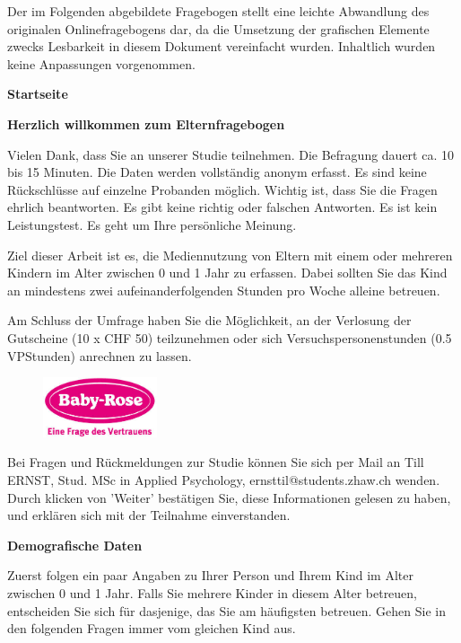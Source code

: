 Der im Folgenden abgebildete Fragebogen stellt eine leichte Abwandlung des originalen Onlinefragebogens dar, da die Umsetzung der grafischen Elemente zwecks Lesbarkeit in diesem Dokument vereinfacht wurden. Inhaltlich wurden keine Anpassungen vorgenommen.

\begin{flushleft}
\textbf{Startseite}

\textbf{Herzlich willkommen zum Elternfragebogen}

\vspace{2mm}
Vielen Dank, dass Sie an unserer Studie teilnehmen. Die Befragung dauert ca. 10 bis 15 Minuten. Die Daten werden vollständig anonym erfasst. Es sind keine Rückschlüsse auf einzelne Probanden möglich. Wichtig ist, dass Sie die Fragen ehrlich beantworten. Es gibt keine richtig oder falschen Antworten. Es ist kein Leistungstest. Es geht um Ihre persönliche Meinung.

\vspace{2mm}
Ziel dieser Arbeit ist es, die Mediennutzung von Eltern mit einem oder mehreren Kindern im Alter zwischen 0 und 1 Jahr zu erfassen. Dabei sollten Sie das Kind an mindestens zwei aufeinanderfolgenden Stunden pro Woche alleine betreuen.

\vspace{2mm}
Am Schluss der Umfrage haben Sie die Möglichkeit, an der Verlosung der Gutscheine (10 x CHF 50) teilzunehmen oder sich Versuchspersonenstunden (0.5 VPStunden) anrechnen zu lassen.

\begin{figure}[hbtp]
  \centering
     \includegraphics[width=0.3\textwidth]{content/Grafik/babyRose_Logo.jpg}
  \label{fig:babyRose_Logo}
\end{figure}

Bei Fragen und Rückmeldungen zur Studie können Sie sich per Mail an Till ERNST, Stud. MSc in Applied Psychology, ernsttil@students.zhaw.ch wenden. Durch klicken von 'Weiter' bestätigen Sie, diese Informationen gelesen zu haben, und erklären sich mit der Teilnahme einverstanden.

\bigskip
\textbf{Demografische Daten}

Zuerst folgen ein paar Angaben zu Ihrer Person und Ihrem Kind im Alter zwischen 0 und 1 Jahr. Falls Sie mehrere Kinder in diesem Alter betreuen, entscheiden Sie sich für dasjenige, das Sie am häufigsten betreuen. Gehen Sie in den folgenden Fragen immer vom gleichen Kind aus.


\end{flushleft}
